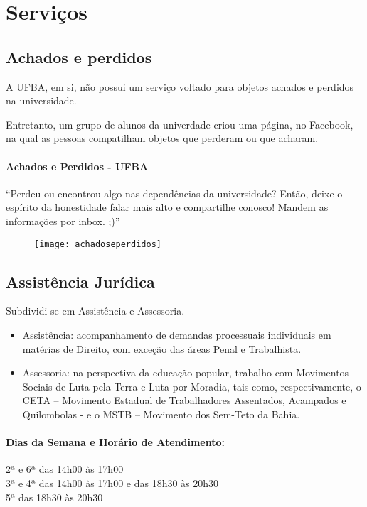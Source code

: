 \chapter{Serviços}

\section{Achados e perdidos}

    A UFBA, em si, não possui um serviço voltado para objetos achados e perdidos na universidade.
    
    Entretanto, um grupo de alunos da univerdade criou uma página, no Facebook, na qual as pessoas compatilham objetos que perderam ou que acharam.
    
        
    \subsubsection{Achados e Perdidos - UFBA}
    
    ``Perdeu ou encontrou algo nas dependências da universidade? Então, deixe o espírito da honestidade falar mais alto e compartilhe conosco! Mandem as informações por inbox. ;)''
    
    \begin{figure}[!htb]
        \centering
        \texttt{[image: achadoseperdidos]}
    \end{figure}

\section{Assistência Jurídica}

        Subdividi-se em Assistência e Assessoria.
        
    \begin{itemize}
        \item Assistência: acompanhamento de demandas processuais individuais em matérias de Direito, com exceção das áreas Penal e Trabalhista. 
        \item Assessoria: na perspectiva da educação popular, trabalho com Movimentos Sociais de Luta pela Terra e Luta por Moradia, tais como, respectivamente, o CETA – Movimento Estadual de Trabalhadores Assentados, Acampados e Quilombolas - e o MSTB – Movimento dos Sem-Teto da Bahia.
    \end{itemize}
    
    \subsubsection {Dias da Semana e Horário de Atendimento:}
        2ª e 6ª das 14h00 às 17h00 \\
        3ª e 4ª das 14h00 às 17h00 e das 18h30 às 20h30 \\
        5ª das 18h30 às 20h30
 
